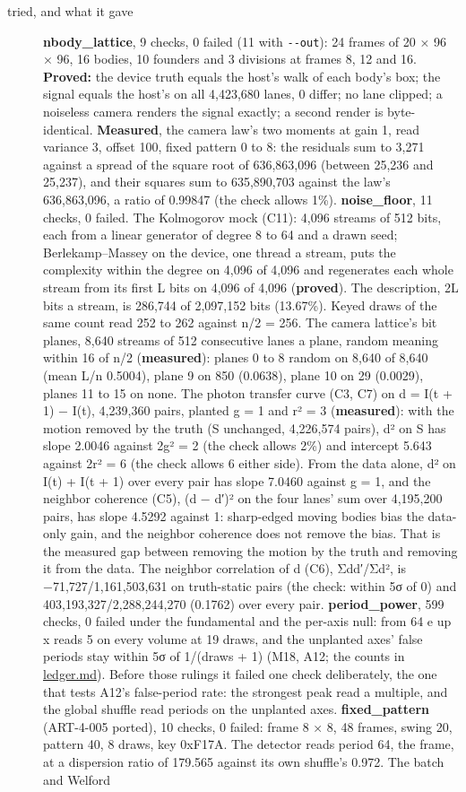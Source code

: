 \begin{description}
\item[{tried, and what it gave}] \textbf{nbody\_\allowbreak{}lattice}, 9 checks, 0 failed (11 with \texttt{-\allowbreak{}-\allowbreak{}out}): 24 frames of 20 × 96 × 96, 16 bodies, 10 founders and 3 divisions at frames 8, 12 and 16. \textbf{Proved:} the device truth equals the host's walk of each body's box; the signal equals the host's on all 4,423,680 lanes, 0 differ; no lane clipped; a noiseless camera renders the signal exactly; a second render is byte-identical. \textbf{Measured}, the camera law's two moments at gain 1, read variance 3, offset 100, fixed pattern 0 to 8: the residuals sum to 3,271 against a spread of the square root of 636,863,096 (between 25,236 and 25,237), and their squares sum to 635,890,703 against the law's 636,863,096, a ratio of 0.99847 (the check allows 1\%). \textbf{noise\_\allowbreak{}floor}, 11 checks, 0 failed. The Kolmogorov mock (C11): 4,096 streams of 512 bits, each from a linear generator of degree 8 to 64 and a drawn seed; Berlekamp–Massey on the device, one thread a stream, puts the complexity within the degree on 4,096 of 4,096 and regenerates each whole stream from its first L bits on 4,096 of 4,096 (\textbf{proved}). The description, 2L bits a stream, is 286,744 of 2,097,152 bits (13.67\%). Keyed draws of the same count read 252 to 262 against n/2 = 256. The camera lattice's bit planes, 8,640 streams of 512 consecutive lanes a plane, random meaning within 16 of n/2 (\textbf{measured}): planes 0 to 8 random on 8,640 of 8,640 (mean L/n 0.5004), plane 9 on 850 (0.0638), plane 10 on 29 (0.0029), planes 11 to 15 on none. The photon transfer curve (C3, C7) on d = I(t + 1) − I(t), 4,239,360 pairs, planted g = 1 and r² = 3 (\textbf{measured}): with the motion removed by the truth (S unchanged, 4,226,574 pairs), d² on S has slope 2.0046 against 2g² = 2 (the check allows 2\%) and intercept 5.643 against 2r² = 6 (the check allows 6 either side). From the data alone, d² on I(t) + I(t + 1) over every pair has slope 7.0460 against g = 1, and the neighbor coherence (C5), (d − d′)² on the four lanes' sum over 4,195,200 pairs, has slope 4.5292 against 1: sharp-edged moving bodies bias the data-only gain, and the neighbor coherence does not remove the bias. That is the measured gap between removing the motion by the truth and removing it from the data. The neighbor correlation of d (C6), Σdd′/Σd², is −71,727/1,161,503,631 on truth-static pairs (the check: within 5σ of 0) and 403,193,327/2,288,244,270 (0.1762) over every pair. \textbf{period\_\allowbreak{}power}, 599 checks, 0 failed under the fundamental and the per-axis null: from 64 e up x reads 5 on every volume at 19 draws, and the unplanted axes' false periods stay within 5σ of 1/(draws + 1) (M18, A12; the counts in \hyperref[chap:ledger]{ledger.md}). Before those rulings it failed one check deliberately, the one that tests A12's false-period rate: the strongest peak read a multiple, and the global shuffle read periods on the unplanted axes. \textbf{fixed\_\allowbreak{}pattern} (ART-4-005 ported), 10 checks, 0 failed: frame 8 × 8, 48 frames, swing 20, pattern 40, 8 draws, key 0xF17A. The detector reads period 64, the frame, at a dispersion ratio of 179.565 against its own shuffle's 0.972. The batch and Welford 
\end{description}
